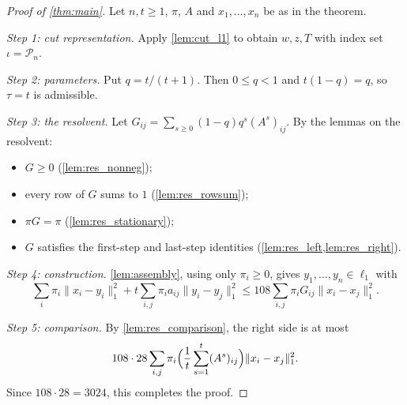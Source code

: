 \documentclass[11pt]{article}
\theoremstyle{definition}
\theoremstyle{remark}
\newcommand{\Pn}{\mathcal{P}_n}
\begin{document}
\begin{proof}[Proof of \cref{thm:main}]
Let $n,t\ge1$, $\pi$, $A$ and $x_1,\dots,x_n$ be as in the theorem.

\emph{Step 1: cut representation.} Apply \cref{lem:cut_l1} to obtain $w,z,T$ with index set $\iota=\Pn$.

\emph{Step 2: parameters.} Put $q=t/(t+1)$. Then $0\le q<1$ and $t(1-q)=q$, so $\tau=t$ is admissible.

\emph{Step 3: the resolvent.} Let $G_{ij}=\sum_{s\ge0}(1-q)q^s(A^s)_{ij}$. By the lemmas on the resolvent:
\begin{itemize}
\item $G\ge0$ (\cref{lem:res_nonneg});
\item every row of $G$ sums to $1$ (\cref{lem:res_rowsum});
\item $\pi G=\pi$ (\cref{lem:res_stationary});
\item $G$ satisfies the first-step and last-step identities (\cref{lem:res_left,lem:res_right}).
\end{itemize}

\emph{Step 4: construction.} \cref{lem:assembly}, using only $\pi_i\ge0$, gives $y_1,\dots,y_n\in\ell_1$ with
\[
\sum_i\pi_i\|x_i-y_i\|_1^2+t\sum_{i,j}\pi_ia_{ij}\|y_i-y_j\|_1^2\le108\sum_{i,j}\pi_iG_{ij}\|x_i-x_j\|_1^2 .
\]

\emph{Step 5: comparison.} By \cref{lem:res_comparison}, the right side is at most
\[
108\cdot28\sum_{i,j}\pi_i\Bigl(\frac1t\sum_{s=1}^t(A^s)_{ij}\Bigr)\|x_i-x_j\|_1^2 .
\]
Since $108\cdot28=3024$, this completes the proof.
\end{proof}
\end{document}

